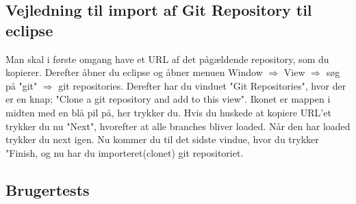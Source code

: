 \subsection{Vejledning til import af Git Repository til eclipse}
Man skal i første omgang have et URL af det pågældende repository, som du kopierer.
Derefter åbner du eclipse og åbner menuen 
Window $\Rightarrow$ View $\Rightarrow$ søg på "git" $\Rightarrow$ git repositories.
Derefter har du vinduet "Git Repositories", hvor der er en knap; "Clone a git repository and add to this view".
Ikonet er mappen i midten med en blå pil på, her trykker du.
Hvis du huskede at kopiere URL'et trykker du nu "Next", hvorefter at alle branches bliver loaded. Når den har loaded trykker du next igen.
Nu kommer du til det sidste vindue, hvor du trykker "Finish, og nu har du importeret(clonet) git repositoriet.

\subsection{Brugertests}

